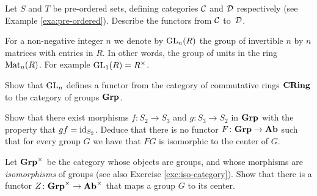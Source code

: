\begin{exercise}
Let $S$ and $T$ be pre-ordered sets, defining categories ${\mathcal{C}}$ and ${\mathcal{D}}$ respectively (see Example \ref{exa:pre-ordered}). Describe the functors from ${\mathcal{C}}$ to~${\mathcal{D}}$.
\end{exercise}

\begin{exercise}\label{exc:functor-GLn}
For a non-negative integer $n$ we denote by $\operatorname{GL}_n(R)$ the group of invertible $n$ by $n$ matrices with entries in $R$. In other words, the group of units in the ring $\operatorname{Mat}_n(R)$. For example $\operatorname{GL}_1(R) = R^\times$.

Show that $\operatorname{GL}_n$ defines a functor from the category of commutative rings $\mathbf{CRing}$ to the category of groups $\mathbf{Grp}$. 
\end{exercise}


\begin{exercise}
Show that there exist morphisms $f\colon S_2 \to S_3$ and $g\colon S_3 \to S_2$ in $\mathbf{Grp}$ with the property that $gf={\rm id}_{S_2}$.
Deduce that there is no functor $F\colon \mathbf{Grp} \to \mathbf{Ab}$ such that for every group $G$ we have that $FG$ is isomorphic to the center of $G$.
\end{exercise}

\begin{exercise}
Let $\mathbf{Grp}^\times$ be the category whose objects are groups, and whose morphisms are \emph{isomorphisms} of groups (see also Exercise \ref{exc:iso-category}). Show that there is a functor $Z\colon \mathbf{Grp}^\times \to \mathbf{Ab}^\times$ that maps
a group $G$ to its center.
\end{exercise}
%



